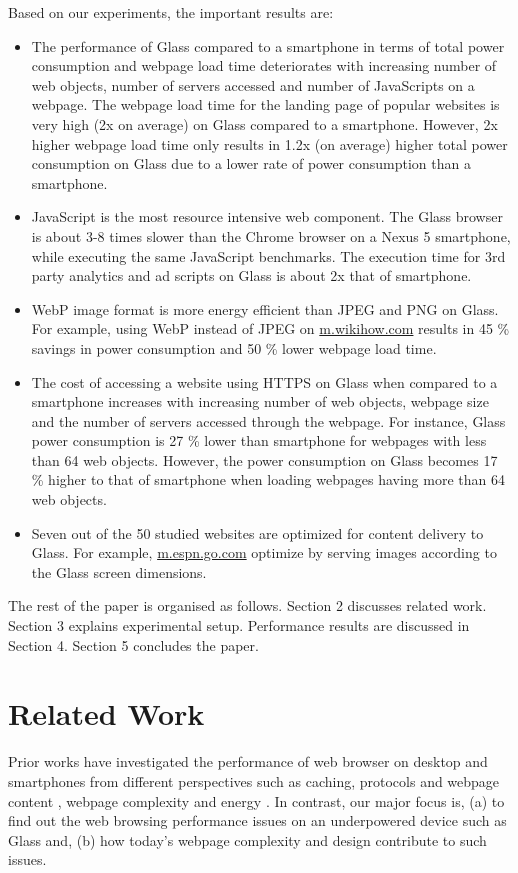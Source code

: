 \documentclass{sig-alternate-10pt}
\begin{document}
Based on our experiments, the important results are:
\begin{itemize}
\item  The performance of Glass compared to a smartphone in terms of total power consumption and webpage load time deteriorates with increasing number of  web objects,  number of servers accessed and number of JavaScripts on a webpage. The webpage load time  for the landing page of  popular websites is very high (2x on average) on Glass compared to a smartphone. However, 2x  higher webpage load time only results in  1.2x (on average) higher total power consumption on Glass due to a lower  rate of power consumption than a smartphone.
\item JavaScript is the most resource intensive web component. The Glass browser is  about 3-8 times slower than the Chrome browser on a Nexus 5 smartphone,  while executing the same JavaScript benchmarks. The execution time for 3rd party analytics and ad scripts on Glass is about 2x that of smartphone.\item WebP image format is  more energy efficient   than JPEG and PNG on Glass. For example, using WebP   instead of JPEG on \url{m.wikihow.com} results in 45 \% savings in power consumption and 50 \% lower   webpage load time.
\item The cost of accessing  a website using HTTPS on Glass when compared to a smartphone increases with increasing number of web objects, webpage size and the  number of servers accessed through the webpage. For instance, Glass power consumption is 27 \% lower than smartphone for webpages with less than 64 web objects. However, the    power consumption on Glass  becomes 17 \% higher to that of  smartphone when loading webpages having more than 64 web objects.
\item Seven out of the 50 studied  websites are optimized for content delivery to  Glass. For example, \url{m.espn.go.com} optimize  by serving images according to  the Glass screen dimensions. 

\end{itemize}



The rest of the paper is organised as follows. Section 2 discusses related work. Section 3 explains  experimental setup.  Performance results are discussed in Section 4. Section 5 concludes the paper. 



\section{Related Work}
Prior works  have investigated the performance  of web browser on desktop  and smartphones  from different perspectives such as caching, protocols and webpage content \cite{Xiao,web}, webpage complexity \cite{micheal} and energy \cite{Thiagarajan}.  In contrast, our major focus is, (a) to find out the web browsing  performance issues on an underpowered device such as Glass and, (b)  how today's webpage complexity and design   contribute to such issues.
\end{document}
